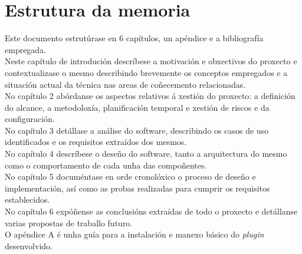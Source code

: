 \section{Estrutura da memoria}

Este documento estrutúrase en 6 capítulos, un apéndice e a bibliografía empregada.\\

Neste capítulo de introdución descríbese a motivación e obxectivos do proxecto e contextualizase o mesmo describindo brevemente os conceptos empregados e a situación actual da técnica nas areas de coñecemento relacionadas.\\

No capítulo 2 abórdanse os aspectos relativos á xestión do proxecto: a definición do alcance, a metodoloxía, planificación temporal e xestión de riscos e da configuración.\\

No capítulo 3 detállase a análise do software, describindo os casos de uso identificados e os requisitos extraídos dos mesmos.\\

No capítulo 4 descríbese o deseño do software, tanto a arquitectura do mesmo como o comportamento de cada unha das compoñentes.\\

No capítulo 5 documéntase en orde cronolóxico o proceso de deseño e implementación, así como as probas realizadas para cumprir os requisitos establecidos.\\

No capítulo 6 expóñense as conclusións extraídas de todo o proxecto e detállanse varias propostas de traballo futuro.\\

O apéndice A é unha guía para a instalación e manexo básico do \emph{plugin} desenvolvido.\\
